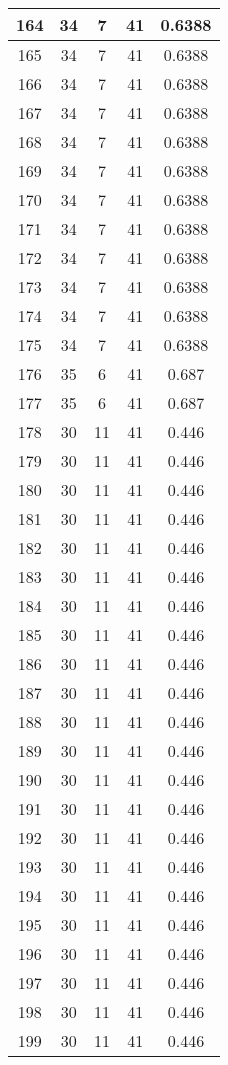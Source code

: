 \documentclass[letterpaper, 12pt]{article}
\begin{document}
\begin{longtable}{|c|c|c|c|c|}
\hline
164 & 34 & 7 & 41 & 0.6388 \\
\hline
165 & 34 & 7 & 41 & 0.6388 \\
\hline
166 & 34 & 7 & 41 & 0.6388 \\
\hline
167 & 34 & 7 & 41 & 0.6388 \\
\hline
168 & 34 & 7 & 41 & 0.6388 \\
\hline
169 & 34 & 7 & 41 & 0.6388 \\
\hline
170 & 34 & 7 & 41 & 0.6388 \\
\hline
171 & 34 & 7 & 41 & 0.6388 \\
\hline
172 & 34 & 7 & 41 & 0.6388 \\
\hline
173 & 34 & 7 & 41 & 0.6388 \\
\hline
174 & 34 & 7 & 41 & 0.6388 \\
\hline
175 & 34 & 7 & 41 & 0.6388 \\
\hline
176 & 35 & 6 & 41 & 0.687 \\
\hline
177 & 35 & 6 & 41 & 0.687 \\
\hline
178 & 30 & 11 & 41 & 0.446 \\
\hline
179 & 30 & 11 & 41 & 0.446 \\
\hline
180 & 30 & 11 & 41 & 0.446 \\
\hline
181 & 30 & 11 & 41 & 0.446 \\
\hline
182 & 30 & 11 & 41 & 0.446 \\
\hline
183 & 30 & 11 & 41 & 0.446 \\
\hline
184 & 30 & 11 & 41 & 0.446 \\
\hline
185 & 30 & 11 & 41 & 0.446 \\
\hline
186 & 30 & 11 & 41 & 0.446 \\
\hline
187 & 30 & 11 & 41 & 0.446 \\
\hline
188 & 30 & 11 & 41 & 0.446 \\
\hline
189 & 30 & 11 & 41 & 0.446 \\
\hline
190 & 30 & 11 & 41 & 0.446 \\
\hline
191 & 30 & 11 & 41 & 0.446 \\
\hline
192 & 30 & 11 & 41 & 0.446 \\
\hline
193 & 30 & 11 & 41 & 0.446 \\
\hline
194 & 30 & 11 & 41 & 0.446 \\
\hline
195 & 30 & 11 & 41 & 0.446 \\
\hline
196 & 30 & 11 & 41 & 0.446 \\
\hline
197 & 30 & 11 & 41 & 0.446 \\
\hline
198 & 30 & 11 & 41 & 0.446 \\
\hline
199 & 30 & 11 & 41 & 0.446 \\
\hline
\end{longtable}
\end{document}
